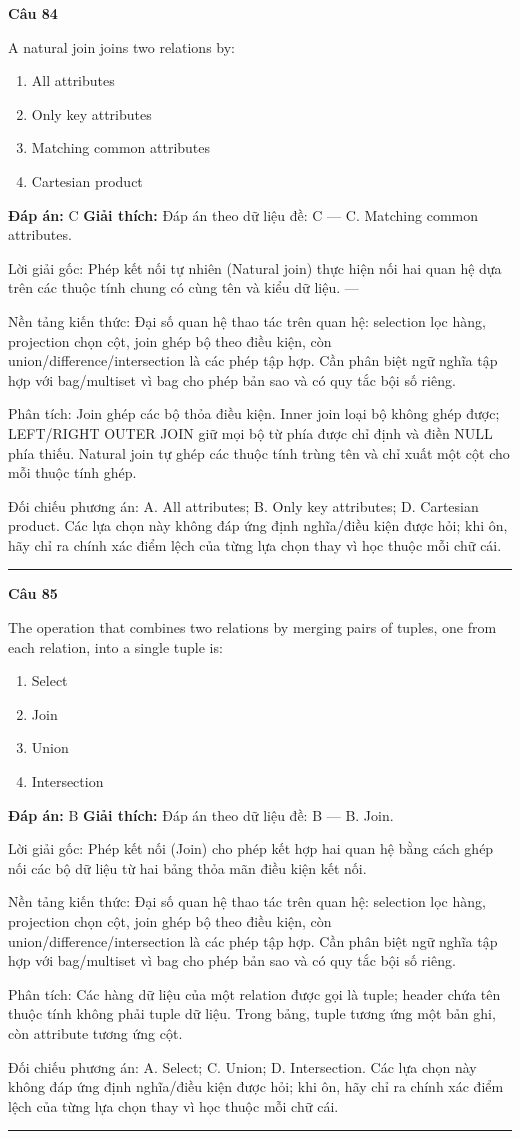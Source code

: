 \documentclass[11pt,a4paper]{article}
\newenvironment{question}[1]{%
  \par\vspace{1em}\noindent\textbf{\large Câu #1}\par\vspace{0.4em}
}{%
  \par\vspace{1em}\hrule\vspace{0.6em}
}
\newenvironment{choices}{%
  \begin{enumerate}[label=\textbf{\Alph*.},leftmargin=2.2em,itemsep=2pt,topsep=3pt]
}{%
  \end{enumerate}
}
\newcommand{\choice}{\item}
\begin{document}
\begin{question}{84}
A natural join joins two relations by:
\begin{choices}
\choice All attributes
\choice Only key attributes
\choice Matching common attributes
\choice Cartesian product
\end{choices}
\textbf{Đáp án:} C
\textbf{Giải thích:} Đáp án theo dữ liệu đề: C — C. Matching common attributes.

Lời giải gốc: Phép kết nối tự nhiên (Natural join) thực hiện nối hai quan hệ dựa trên các thuộc tính chung có cùng tên và kiểu dữ liệu. ---

Nền tảng kiến thức: Đại số quan hệ thao tác trên quan hệ: selection lọc hàng, projection chọn cột, join ghép bộ theo điều kiện, còn union/difference/intersection là các phép tập hợp. Cần phân biệt ngữ nghĩa tập hợp với bag/multiset vì bag cho phép bản sao và có quy tắc bội số riêng.

Phân tích: Join ghép các bộ thỏa điều kiện. Inner join loại bộ không ghép được; LEFT/RIGHT OUTER JOIN giữ mọi bộ từ phía được chỉ định và điền NULL phía thiếu. Natural join tự ghép các thuộc tính trùng tên và chỉ xuất một cột cho mỗi thuộc tính ghép.

Đối chiếu phương án: A. All attributes; B. Only key attributes; D. Cartesian product. Các lựa chọn này không đáp ứng định nghĩa/điều kiện được hỏi; khi ôn, hãy chỉ ra chính xác điểm lệch của từng lựa chọn thay vì học thuộc mỗi chữ cái.
\end{question}

\begin{question}{85}
The operation that combines two relations by merging pairs of tuples, one from each relation, into a single tuple is:
\begin{choices}
\choice Select
\choice Join
\choice Union
\choice Intersection
\end{choices}
\textbf{Đáp án:} B
\textbf{Giải thích:} Đáp án theo dữ liệu đề: B — B. Join.

Lời giải gốc: Phép kết nối (Join) cho phép kết hợp hai quan hệ bằng cách ghép nối các bộ dữ liệu từ hai bảng thỏa mãn điều kiện kết nối.

Nền tảng kiến thức: Đại số quan hệ thao tác trên quan hệ: selection lọc hàng, projection chọn cột, join ghép bộ theo điều kiện, còn union/difference/intersection là các phép tập hợp. Cần phân biệt ngữ nghĩa tập hợp với bag/multiset vì bag cho phép bản sao và có quy tắc bội số riêng.

Phân tích: Các hàng dữ liệu của một relation được gọi là tuple; header chứa tên thuộc tính không phải tuple dữ liệu. Trong bảng, tuple tương ứng một bản ghi, còn attribute tương ứng cột.

Đối chiếu phương án: A. Select; C. Union; D. Intersection. Các lựa chọn này không đáp ứng định nghĩa/điều kiện được hỏi; khi ôn, hãy chỉ ra chính xác điểm lệch của từng lựa chọn thay vì học thuộc mỗi chữ cái.
\end{question}
\end{document}
